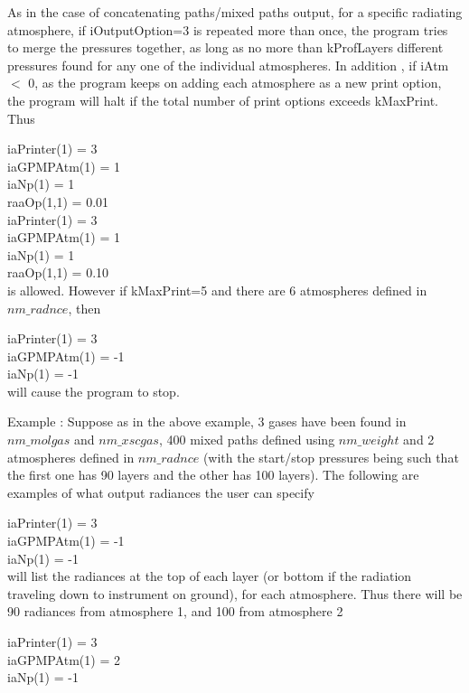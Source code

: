 \documentclass[12pt]{article}
\newcommand{\ttab}{\indent\indent}
\begin{document}
{{As in the case of concatenating paths/mixed paths output, 
for a specific radiating atmosphere, if iOutputOption=3 is repeated 
more than once, the program tries to merge the pressures together, as long as
no more than kProfLayers different pressures found for any one of the 
individual atmospheres.  In addition , if iAtm $<$ 0, as the program keeps 
on adding each atmosphere as a new print option, the program will halt if the 
total number of print options exceeds kMaxPrint.  Thus

\medskip
\ttab iaPrinter(1) = 3\\
\ttab iaGPMPAtm(1) = 1\\
\ttab iaNp(1)      = 1\\
\ttab raaOp(1,1)   = 0.01\\
\ttab iaPrinter(1) = 3\\
\ttab iaGPMPAtm(1) = 1\\
\ttab iaNp(1)      = 1\\
\ttab raaOp(1,1)   = 0.10\\

\medskip
\noindent 
is allowed.  However if kMaxPrint=5 and there are 6 atmospheres
defined in $nm\_radnce$, then

\medskip
\ttab iaPrinter(1) = 3\\
\ttab iaGPMPAtm(1) = -1\\
\ttab iaNp(1)      = -1\\

\medskip
\noindent
will cause the program to stop.

Example : Suppose as in the above example, 3 gases have been found 
in $nm\_molgas$ and $nm\_xscgas$, 400 mixed paths defined using $nm\_weight$
and 2 atmospheres defined in $nm\_radnce$ (with the start/stop pressures 
being such that the first one has 90 layers and the other has 100 layers).  
The following are examples of what output radiances the user can specify

\medskip
\ttab iaPrinter(1) = 3\\
\ttab iaGPMPAtm(1) = -1\\
\ttab iaNp(1)      = -1\\

\medskip\noindent
will list the radiances at the top of each layer (or bottom if the radiation
traveling down to instrument on ground), for each atmosphere.  Thus there 
will be 90 radiances from atmosphere 1, and 100 from atmosphere 2

\medskip
\ttab iaPrinter(1) = 3\\
\ttab iaGPMPAtm(1) = 2\\
\ttab iaNp(1)      = -1\\

}}
\end{document}
